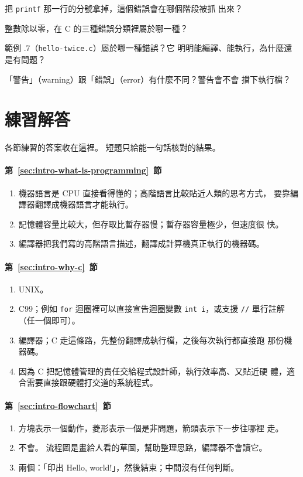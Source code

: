 \begin{drills}[label=drills:intro-error-types]
\item 把 \texttt{printf} 那一行的分號拿掉，這個錯誤會在哪個階段被抓
出來？
\item 整數除以零，在 C 的三種錯誤分類裡屬於哪一種？
\item 範例 \thechapter.7（\texttt{hello-twice.c}）屬於哪一種錯誤？它
明明能編譯、能執行，為什麼還是有問題？
\item 「警告」（warning）跟「錯誤」（error）有什麼不同？警告會不會
擋下執行檔？
\end{drills}

\section*{練習解答}

各節練習的答案收在這裡。 短題只給能一句話核對的結果。

\paragraph{第~\ref{sec:intro-what-is-programming}~節}
\begin{enumerate}
\item 機器語言是 CPU 直接看得懂的；高階語言比較貼近人類的思考方式，
要靠編譯器翻譯成機器語言才能執行。
\item 記憶體容量比較大，但存取比暫存器慢；暫存器容量極少，但速度很
快。
\item 編譯器把我們寫的高階語言描述，翻譯成計算機真正執行的機器碼。
\end{enumerate}

\paragraph{第~\ref{sec:intro-why-c}~節}
\begin{enumerate}
\item UNIX。
\item C99；例如 \texttt{for} 迴圈裡可以直接宣告迴圈變數
\texttt{int i}，或支援 \texttt{//} 單行註解（任一個即可）。
\item 編譯器；C 走這條路，先整份翻譯成執行檔，之後每次執行都直接跑
那份機器碼。
\item 因為 C 把記憶體管理的責任交給程式設計師，執行效率高、又貼近硬
體，適合需要直接跟硬體打交道的系統程式。
\end{enumerate}

\paragraph{第~\ref{sec:intro-flowchart}~節}
\begin{enumerate}
\item 方塊表示一個動作，菱形表示一個是非問題，箭頭表示下一步往哪裡
走。
\item 不會。 流程圖是畫給人看的草圖，幫助整理思路，編譯器不會讀它。
\item 兩個：「印出 Hello, world!」，然後結束；中間沒有任何判斷。
\end{enumerate}

